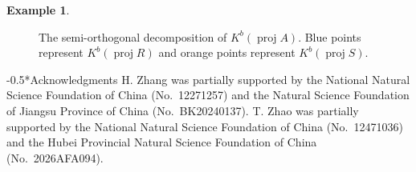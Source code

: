 \documentclass[reqno,12pt]{amsart}
\makeatletter
\numberwithin{equation}{section}
\theoremstyle{plain}
\theoremstyle{definition}
\newtheorem{example}[theorem]{\bf Example}
\renewcommand{\section}{\@startsection{section}{1}{0mm}
  {-\baselineskip}{0.5\baselineskip}{\bf\leftline}}
\makeatother
\begin{document}
\begin{example}
\begin{figure}[htbp]
\caption{The semi-orthogonal decomposition of $K^b(\operatorname{proj}A)$. Blue points represent $K^b(\operatorname{proj}R)$ and orange points represent $K^b(\operatorname{proj}S)$. }
\label{fig:example53}
\end{figure}
\end{example}





\section*{Acknowledgments}
H. Zhang was partially supported by the National Natural Science Foundation of China (No.~12271257) and the Natural Science Foundation of Jiangsu Province of China (No.~BK20240137). T. Zhao was partially supported by the National Natural Science Foundation of China (No.~12471036) and the Hubei Provincial Natural Science Foundation of China (No.~2026AFA094).
\end{document}
